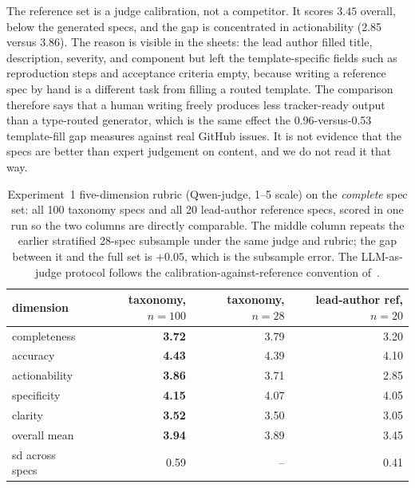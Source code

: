 \documentclass[sigconf, anonymous]{acmart}
\begin{document}
The reference set is a judge calibration, not a competitor. It scores $3.45$ overall, below the
generated specs, and the gap is concentrated in actionability (2.85 versus 3.86). The reason is
visible in the sheets: the lead author filled title, description, severity, and component but
left the template-specific fields such as reproduction steps and acceptance criteria empty,
because writing a reference spec by hand is a different task from filling a routed template. The
comparison therefore says that a human writing freely produces less tracker-ready output than a
type-routed generator, which is the same effect the 0.96-versus-0.53 template-fill gap measures
against real GitHub issues. It is not evidence that the specs are better than expert judgement
on content, and we do not read it that way.

\begin{table}[t]\centering\footnotesize
\caption{Experiment~1 five-dimension rubric (Qwen-judge, 1--5 scale) on the \emph{complete}
spec set: all 100 taxonomy specs and all 20 lead-author reference specs, scored in one run so
the two columns are directly comparable. The middle column repeats the earlier stratified
28-spec subsample under the same judge and rubric; the gap between it and the full set is
$+0.05$, which is the subsample error. The LLM-as-judge protocol follows the
calibration-against-reference convention of~\cite{gilardi2023chatgpt, pangakis2023automated,
zheng2023judging}.}\label{tab:rubric}
\begin{tabular}{lrrr}\toprule
dimension & taxonomy, $n=100$ & taxonomy, $n=28$ & lead-author ref, $n=20$ \\\midrule
completeness & \textbf{3.72} & 3.79 & 3.20 \\
accuracy & \textbf{4.43} & 4.39 & 4.10 \\
actionability & \textbf{3.86} & 3.71 & 2.85 \\
specificity & \textbf{4.15} & 4.07 & 4.05 \\
clarity & \textbf{3.52} & 3.50 & 3.05 \\\midrule
overall mean & \textbf{3.94} & 3.89 & 3.45 \\
sd across specs & 0.59 & -- & 0.41 \\
\bottomrule\end{tabular}\end{table}
\end{document}
